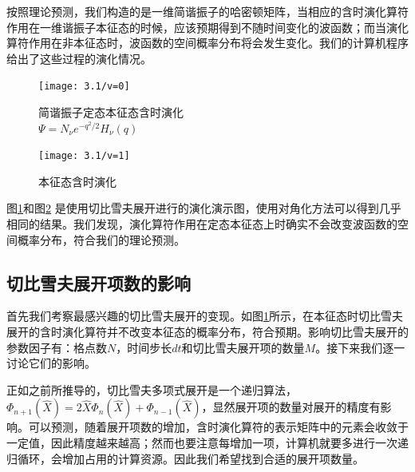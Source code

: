 按照理论预测，我们构造的是一维简谐振子的哈密顿矩阵，当相应的含时演化算符作用在一维谐振子本征态的时候，应该预期得到不随时间变化的波函数；而当演化算符作用在非本征态时，波函数的空间概率分布将会发生变化。我们的计算机程序给出了这些过程的演化情况。
\begin{figure}[hbt]
  \centering
  \captionsetup{justification=centering}
  \vspace{1mm}
  \texttt{[image: 3.1/v=0]}
  \caption{简谐振子定态本征态含时演化 \\
            $\Psi = N_{\nu}e^{-q^2/2}H_{\nu}(q)$ \label{fig:prop1}}
\end{figure}

\begin{figure}[hbt]
  \centering
  \captionsetup{justification=centering}
  \vspace{1mm}
  \texttt{[image: 3.1/v=1]} 
  \caption{本征态含时演化  \label{fig:prop2}}
\end{figure}

图\ref{fig:prop1}和图\ref{fig:prop2} 是使用切比雪夫展开进行的演化演示图，使用对角化方法可以得到几乎相同的结果。我们发现，演化算符作用在定态本征态上时确实不会改变波函数的空间概率分布，符合我们的理论预测。


\subsection{切比雪夫展开项数的影响}
首先我们考察最感兴趣的切比雪夫展开的变现。如图\ref{fig:prop1}所示，在本征态时切比雪夫展开的含时演化算符并不改变本征态的概率分布，符合预期。影响切比雪夫展开的参数因子有：格点数$N$，时间步长$dt$和切比雪夫展开项的数量$M$。接下来我们逐一讨论它们的影响。

正如之前所推导的，切比雪夫多项式展开是一个递归算法，$\Phi_{n+1}(\hat{X}) = 2\hat{X}\Phi_{n}(\hat{X}) + \Phi_{n-1}(\hat{X})$，显然展开项的数量对展开的精度有影响。可以预测，随着展开项数的增加，含时演化算符的表示矩阵中的元素会收敛于一定值，因此精度越来越高；然而也要注意每增加一项，计算机就要多进行一次递归循环，会增加占用的计算资源。因此我们希望找到合适的展开项数量。

